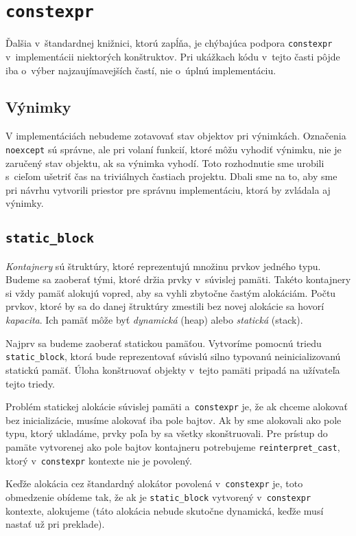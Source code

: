 \section{\texttt{constexpr}}

Ďalšia  v~štandardnej knižnici, ktorú \PP{} zapĺňa, je chýbajúca podpora \texttt{constexpr} v~implementácii niektorých konštruktov. Pri ukážkach kódu v~tejto časti pôjde iba o~výber najzaujímavejších častí, nie o~úplnú implementáciu.

\subsection{Výnimky}

V implementáciách nebudeme zotavovať stav objektov pri výnimkách. Označenia \texttt{noexcept} sú správne, ale pri volaní funkcií, ktoré môžu vyhodiť výnimku, nie je zaručený stav objektu, ak sa výnimka vyhodí. Toto rozhodnutie sme urobili s~cieľom ušetriť čas na triviálnych častiach projektu. Dbali sme na to, aby sme pri návrhu vytvorili priestor pre správnu implementáciu, ktorá by zvládala aj výnimky.

\subsection{\texttt{static\_block}}

\emph{Kontajnery} sú štruktúry, ktoré reprezentujú množinu prvkov jedného typu. Budeme sa zaoberať tými, ktoré držia prvky v~súvislej pamäti. Takéto kontajnery si vždy pamäť alokujú vopred, aby sa vyhli zbytočne častým alokáciám. Počtu prvkov, ktoré by sa do danej štruktúry zmestili bez novej alokácie sa hovorí \emph{kapacita}. Ich pamäť môže byť \emph{dynamická} (heap) alebo \emph{statická} (stack).

Najprv sa budeme zaoberať statickou pamäťou. Vytvoríme pomocnú triedu \texttt{static\_block}, ktorá bude reprezentovať súvislú silno typovanú neinicializovanú statickú pamäť. Úloha konštruovať objekty v~tejto pamäti pripadá na užívateľa tejto triedy.

Problém statickej alokácie súvislej pamäti a~\texttt{constexpr} je, že ak chceme alokovať bez inicializácie, musíme alokovať iba pole bajtov. Ak by sme alokovali ako pole typu, ktorý ukladáme, prvky poľa by sa všetky skonštruovali. Pre prístup do pamäte vytvorenej ako pole bajtov kontajneru potrebujeme \texttt{reinterpret\_cast}, ktorý v~\texttt{constexpr} kontexte nie je povolený. 

Keďže alokácia cez štandardný alokátor povolená v~\texttt{constexpr} je, toto obmedzenie obídeme tak, že ak je \texttt{static\_block} vytvorený v~\texttt{constexpr} kontexte, alokujeme  (táto alokácia nebude skutočne dynamická, keďže musí nastať už pri preklade).

